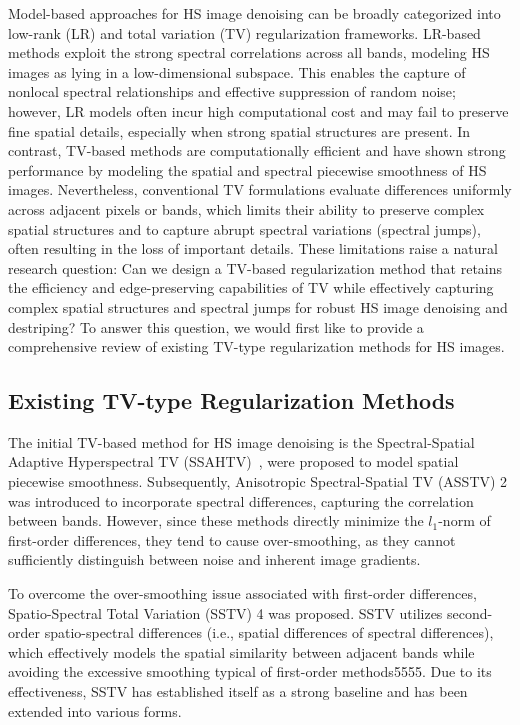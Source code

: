 Model-based approaches for HS image denoising can be broadly categorized into low-rank (LR) and total variation (TV) regularization frameworks. LR-based methods exploit the strong spectral correlations across all bands, modeling HS images as lying in a low-dimensional subspace. This enables the capture of nonlocal spectral relationships and effective suppression of random noise; however, LR models often incur high computational cost and may fail to preserve fine spatial details, especially when strong spatial structures are present. In contrast, TV-based methods are computationally efficient and have shown strong performance by modeling the spatial and spectral piecewise smoothness of HS images. Nevertheless, conventional TV formulations evaluate differences uniformly across adjacent pixels or bands, which limits their ability to preserve complex spatial structures and to capture abrupt spectral variations (spectral jumps), often resulting in the loss of important details. These limitations raise a natural research question: Can we design a TV-based regularization method that retains the efficiency and edge-preserving capabilities of TV while effectively capturing complex spatial structures and spectral jumps for robust HS image denoising and destriping? To answer this question, we would first like to provide a comprehensive review of existing TV-type regularization methods for HS images.


\subsection{Existing TV-type Regularization Methods}
\label{sec:existing_tv_methods}
The initial TV-based method for HS image denoising is the Spectral-Spatial Adaptive Hyperspectral TV (SSAHTV)~\cite{Yuan2012HTV}, were proposed to model spatial piecewise smoothness. Subsequently, Anisotropic Spectral-Spatial TV (ASSTV) 2 was introduced to incorporate spectral differences, capturing the correlation between bands. However, since these methods directly minimize the $l_1$-norm of first-order differences, they tend to cause over-smoothing, as they cannot sufficiently distinguish between noise and inherent image gradients.


To overcome the over-smoothing issue associated with first-order differences, Spatio-Spectral Total Variation (SSTV) 4 was proposed. SSTV utilizes second-order spatio-spectral differences (i.e., spatial differences of spectral differences), which effectively models the spatial similarity between adjacent bands while avoiding the excessive smoothing typical of first-order methods5555. Due to its effectiveness, SSTV has established itself as a strong baseline and has been extended into various forms.


